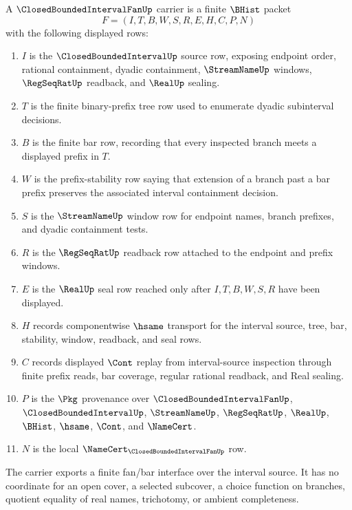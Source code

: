 \begin{definition}
\label{def:closed-bounded-interval-fan-carrier}
A $\ClosedBoundedIntervalFanUp$ carrier is a finite $\BHist$ packet
$$
F=(I,T,B,W,S,R,E,H,C,P,N)
$$
with the following displayed rows:
\begin{enumerate}
\item $I$ is the $\ClosedBoundedIntervalUp$ source row, exposing endpoint order, rational containment, dyadic containment, $\StreamNameUp$ windows, $\RegSeqRatUp$ readback, and $\RealUp$ sealing.
\item $T$ is the finite binary-prefix tree row used to enumerate dyadic subinterval decisions.
\item $B$ is the finite bar row, recording that every inspected branch meets a displayed prefix in $T$.
\item $W$ is the prefix-stability row saying that extension of a branch past a bar prefix preserves the associated interval containment decision.
\item $S$ is the $\StreamNameUp$ window row for endpoint names, branch prefixes, and dyadic containment tests.
\item $R$ is the $\RegSeqRatUp$ readback row attached to the endpoint and prefix windows.
\item $E$ is the $\RealUp$ seal row reached only after $I,T,B,W,S,R$ have been displayed.
\item $H$ records componentwise $\hsame$ transport for the interval source, tree, bar, stability, window, readback, and seal rows.
\item $C$ records displayed $\Cont$ replay from interval-source inspection through finite prefix reads, bar coverage, regular rational readback, and Real sealing.
\item $P$ is the $\Pkg$ provenance over $\ClosedBoundedIntervalFanUp$, $\ClosedBoundedIntervalUp$, $\StreamNameUp$, $\RegSeqRatUp$, $\RealUp$, $\BHist$, $\hsame$, $\Cont$, and $\NameCert$.
\item $N$ is the local $\NameCert_{\ClosedBoundedIntervalFanUp}$ row.
\end{enumerate}
The carrier exports a finite fan/bar interface over the interval source. It has no coordinate for an open cover, a selected subcover, a choice function on branches, quotient equality of real names, trichotomy, or ambient completeness.
\end{definition}

